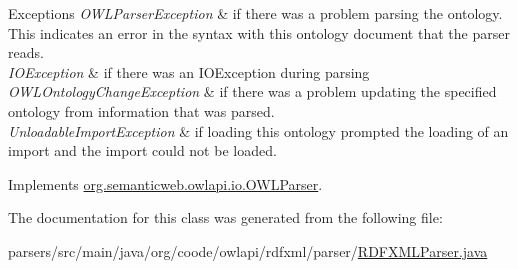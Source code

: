 \begin{DoxyExceptions}{Exceptions}
{\em O\-W\-L\-Parser\-Exception} & if there was a problem parsing the ontology. This indicates an error in the syntax with this ontology document that the parser reads. \\
\hline
{\em I\-O\-Exception} & if there was an I\-O\-Exception during parsing \\
\hline
{\em O\-W\-L\-Ontology\-Change\-Exception} & if there was a problem updating the specified ontology from information that was parsed. \\
\hline
{\em Unloadable\-Import\-Exception} & if loading this ontology prompted the loading of an import and the import could not be loaded. \\
\hline
\end{DoxyExceptions}


Implements \hyperlink{interfaceorg_1_1semanticweb_1_1owlapi_1_1io_1_1_o_w_l_parser_a259739c6baf94f4e5a2dad5d0400f07a}{org.\-semanticweb.\-owlapi.\-io.\-O\-W\-L\-Parser}.



The documentation for this class was generated from the following file\-:\begin{DoxyCompactItemize}
\item 
parsers/src/main/java/org/coode/owlapi/rdfxml/parser/\hyperlink{_r_d_f_x_m_l_parser_8java}{R\-D\-F\-X\-M\-L\-Parser.\-java}\end{DoxyCompactItemize}
